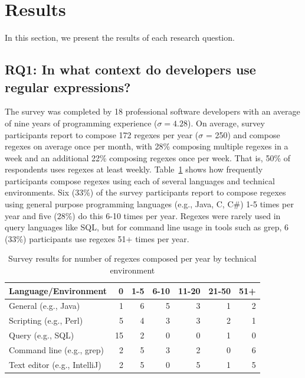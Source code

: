 \section{Results}
\label{sec:results}



In this section, we present the results of each research question.

\subsection{RQ1: In what context do developers use regular expressions?}
\label{rq1:survey}

The survey was completed by 18 professional software developers with an average of nine years of programming experience ($\sigma = 4.28$). 
On average, survey participants report to compose 172 regexes per year ($\sigma$ = 250) and compose regexes on average once per month, with 28\% composing multiple regexes in a week and an additional 22\% composing regexes once per week. That is, 50\% of respondents uses regexes at least weekly. 
Table~\ref{tab:regexenviron} shows how frequently participants compose regexes using each of several languages and technical environments.
Six (33\%) of the survey participants report to compose regexes using general purpose programming languages (e.g., Java, C, C\#) 1-5 times per year and five (28\%) do this 6-10 times per year.  Regexes were rarely used in query languages like SQL, but for command line usage in tools such as grep, 6 (33\%) participants use regexes 51+ times per year. 

\newcommand{\horiz}{\hspace{2.1pt}}

\begin{table}
\caption{Survey results for number of regexes composed per year by technical environment \label{tab:regexenviron}}
\begin{center}
\begin{small}
\begin{tabular}{l | r @{  \horiz} r @{ \horiz } r @{ \horiz } r @{ \horiz } r @{ \horiz } r }
Language/Environment & 0 & 1-5 & 6-10 & 11-20 & 21-50 & 51+ \\ \hline
General  (e.g., Java)  & 1 & 6 & 5 & 3& 1& 2 \\
Scripting  (e.g., Perl) &5 &4 &3 &3 &2  &1 \\
Query  (e.g., SQL) & 15&2 &0 &0 &1  & 0\\
Command line (e.g., grep)   &2 &5 &3 &2 &0  &6 \\
Text editor (e.g., IntelliJ)   & 2& 5& 0& 5& 1& 5\\
\end{tabular}
\end{small}
\end{center}
\end{table}


